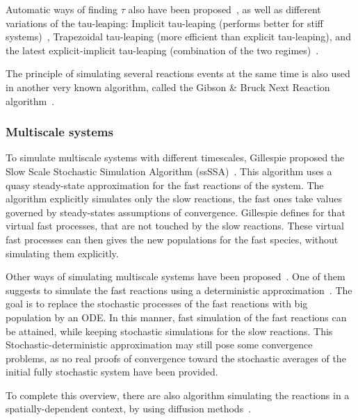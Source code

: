 		Automatic ways of finding $\tau$ also have been proposed~\cite{Cao:2006p6200}, as well as different variations of the tau-leaping: Implicit tau-leaping (performs better for stiff systems)~\cite{Rathinam:2003p5164}, Trapezoidal tau-leaping (more efficient than explicit tau-leaping), and the latest explicit-implicit tau-leaping (combination of the two regimes)~\cite{Cao:2007p5660}.
		
		The principle of simulating several reactions events at the same time is also used in another very known algorithm, called the Gibson \& Bruck Next Reaction algorithm~\cite{Gibson:2000p11408}.
		
		\subsubsection{Multiscale systems} %
		\label{ssub:ssssa}
		To simulate multiscale systems with different timescales, Gillespie proposed the Slow Scale Stochastic Simulation Algorithm (ssSSA)~\cite{Cao:2005p5171, Cao:2007p5660, Cao:2005p5664, Gillespie:2007p5659}. 
		This algorithm uses a quasy steady-state approximation for the fast reactions of the system. The algorithm explicitly simulates only the slow reactions, the fast ones take values governed by steady-states assumptions of convergence. Gillespie defines for that virtual fast processes, that are not touched by the slow reactions. These virtual fast processes can then gives the new populations for the fast species, without simulating them explicitly.

		Other ways of simulating multiscale systems have been proposed~\cite{Puchalka:2004p4312}. One of them suggests to simulate the fast reactions using a deterministic approximation~\cite{Haseltine:2002p4632, Haseltine:2005p4685, Kiehl:2004p4266}. The goal is to replace the stochastic processes of the fast reactions with big population by an ODE. In this manner, fast simulation of the fast reactions can be attained, while keeping stochastic simulations for the slow reactions. This Stochastic-deterministic approximation may still pose some convergence problems, as no real proofs of convergence toward the stochastic averages of the initial fully stochastic system have been provided.
		
		To complete this overview, there are also algorithm simulating the reactions in a spatially-dependent context, by using diffusion methods~\cite{Isaacson:2006p5432, Andrews:2004p5310, Lu:2004p4353, Turner:2004p4446}.
		
